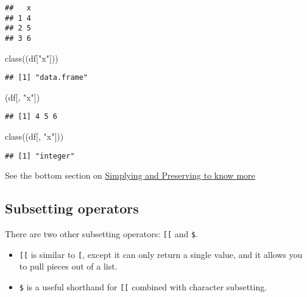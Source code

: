 \documentclass[
]{book}
\newenvironment{Shaded}{\begin{snugshade}}{\end{snugshade}}
\newcommand{\FunctionTok}[1]{\textcolor[rgb]{0.00,0.00,0.00}{#1}}
\newcommand{\NormalTok}[1]{#1}
\newcommand{\StringTok}[1]{\textcolor[rgb]{0.31,0.60,0.02}{#1}}
\providecommand{\tightlist}{%
  \setlength{\itemsep}{0pt}\setlength{\parskip}{0pt}}
\begin{document}
\begin{verbatim}
##   x
## 1 4
## 2 5
## 3 6
\end{verbatim}

\begin{Shaded}
\begin{Highlighting}[]
\FunctionTok{class}\NormalTok{((df[}\StringTok{"x"}\NormalTok{]))}
\end{Highlighting}
\end{Shaded}

\begin{verbatim}
## [1] "data.frame"
\end{verbatim}

\begin{Shaded}
\begin{Highlighting}[]
\NormalTok{(df[, }\StringTok{"x"}\NormalTok{])}
\end{Highlighting}
\end{Shaded}

\begin{verbatim}
## [1] 4 5 6
\end{verbatim}

\begin{Shaded}
\begin{Highlighting}[]
\FunctionTok{class}\NormalTok{((df[, }\StringTok{"x"}\NormalTok{]))}
\end{Highlighting}
\end{Shaded}

\begin{verbatim}
## [1] "integer"
\end{verbatim}

See the bottom section on \protect\hyperlink{simplify-preserve}{Simplying and Preserving to know more}

\hypertarget{subsetting-operators}{%
\subsection{Subsetting operators}\label{subsetting-operators}}

There are two other subsetting operators: \texttt{{[}{[}} and \texttt{\$}.

\begin{itemize}
\tightlist
\item
  \texttt{{[}{[}} is similar to \texttt{{[}}, except it can only return a single value, and it allows you to pull pieces out of a list.
\item
  \texttt{\$} is a useful shorthand for \texttt{{[}{[}} combined with character subsetting.
\end{itemize}
\end{document}
